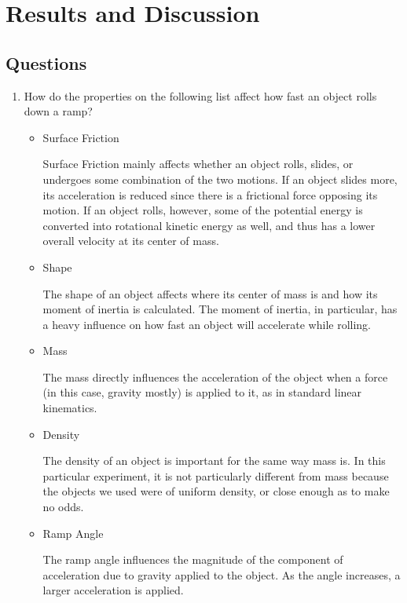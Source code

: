 \section{Results and Discussion}

\subsection{Questions}

\begin{enumerate}

\item How do the properties on the following list affect how fast an object rolls down a ramp?

\begin{itemize}

\item Surface Friction

Surface Friction mainly affects whether an object rolls, slides, or undergoes some combination of the two motions.
If an object slides more, its acceleration is reduced since there is a frictional force opposing its motion.
If an object rolls, however, some of the potential energy is converted into rotational kinetic energy as well, and thus has a lower overall velocity at its center of mass.

\item Shape

The shape of an object affects where its center of mass is and how its moment of inertia is calculated.
The moment of inertia, in particular, has a heavy influence on how fast an object will accelerate while rolling.

\item Mass

The mass directly influences the acceleration of the object when a force (in this case, gravity mostly) is applied to it, as in standard linear kinematics.

\item Density

The density of an object is important for the same way mass is.
In this particular experiment, it is not particularly different from mass because the objects we used were of uniform density, or close enough as to make no odds.

\item Ramp Angle

The ramp angle influences the magnitude of the component of acceleration due to gravity applied to the object.
As the angle increases, a larger acceleration is applied.


\end{itemize}
\end{enumerate}
